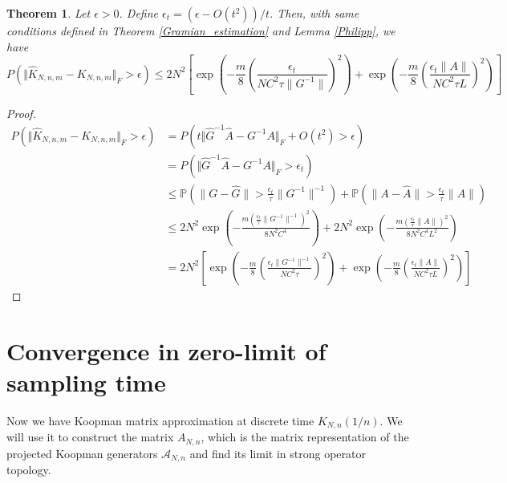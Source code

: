 \documentclass{article}[11]
\newtheorem{theorem}{Theorem}
\begin{document}
\begin{theorem}
	Let $\epsilon>0$. Define $\epsilon_t = \left(\epsilon - O(t^2)\right)/t$. Then, with same conditions defined in Theorem \ref{Gramian_estimation} and Lemma \ref{Philipp}, we have
	\begin{equation*}
		P\left(\Vert \widehat{K}_{N,n,m} - K_{N,n,m} \Vert_F > \epsilon \right) \leq 2N^2 \left[ \exp \left( -\frac{m}{8} \left(\frac{\epsilon_t}{N C^2 \tau \|G^{-1}\|}\right)^2 \right) + \exp \left( -\frac{m}{8} \left(\frac{\epsilon_t \|A\|}{N C^2 \tau L}\right)^2 \right) \right]
	\end{equation*}  
\end{theorem}
\begin{proof}
	\begin{align*}
		P\left(\Vert \widehat{K}_{N,n,m} - K_{N,n,m} \Vert_F > \epsilon \right) 
		&= P\left( t\Vert \widehat{G}^{-1} \widehat{A} - G^{-1}A \Vert_F + O(t^2) > \epsilon \right) \\
		&= P\left( \Vert \widehat{G}^{-1} \widehat{A} - G^{-1}A \Vert_F  > \epsilon_t \right) \\
		&\leq \mathbb{P}\left(\|G - \widehat{G}\| > \frac{\epsilon_t}{\tau} \|G^{-1}\|^{-1} \right) + \mathbb{P}\left(\|A - \widehat{A}\| > \frac{\epsilon_t}{\tau} \|A\| \right) \\
		&\leq 2N^2 \exp \left( -\frac{m (\frac{\epsilon_t}{\tau} \|G^{-1}\|^{-1})^2}{8 N^2 C^4} \right) + 2N^2 \exp \left( -\frac{m (\frac{\epsilon_t}{\tau} \|A\|)^2}{8 N^2 C^4 L^2} \right) \\
		&= 2N^2 \left[ \exp \left( -\frac{m}{8} \left(\frac{\epsilon_t \|G^{-1}\|^{-1}}{N C^2 \tau}\right)^2 \right) + \exp \left( -\frac{m}{8} \left(\frac{\epsilon_t \|A\|}{N C^2 \tau L}\right)^2 \right) \right]
	\end{align*}  
\end{proof}


\newpage
\section{Convergence in zero-limit of sampling time}
Now we have Koopman matrix approximation at discrete time $K_{N,n}(1/n)$. We will use it to construct the matrix $A_{N,n}$, which is the matrix representation of the projected Koopman generators $\mathcal{A}_{N,n}$ and find its limit in strong operator topology. 
\end{document}

